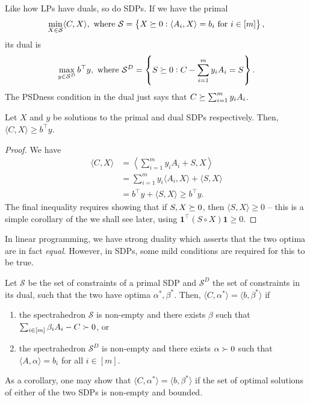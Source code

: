 	Like how LPs have duals, so do SDPs. If we have the primal
	\[ \min_{X \in \mathcal{S}} \langle C,X\rangle , \text{ where } \mathcal{S} = \left\{ X \succeq 0 : \langle A_i,X\rangle = b_i \text{ for $i \in [m]$} \right\}, \]
	its dual is
	\[ \max_{y \in \mathcal{S}^D} b^\top y, \text{ where } \mathcal{S}^D = \left\{ S \succeq 0 : C - \sum_{i=1}^m y_i A_i = S \right\}. \]
	The PSDness condition in the dual just says that $C \succeq \sum_{i=1}^m y_i A_i$.

	\begin{fprop}
		Let $X$ and $y$ be solutions to the primal and dual SDPs respectively. Then, $\langle C,X\rangle \ge b^\top y$.
	\end{fprop}
	\begin{proof}
		We have
		\begin{align*}
			\langle C,X\rangle &= \left\langle \sum_{i=1}^m y_i A_i + S , X \right\rangle \\
				&= \sum_{i=1}^m y_i \langle A_i,X\rangle + \langle S,X\rangle \\
				&= b^\top y + \langle S,X\rangle \ge b^\top y.
		\end{align*}
		The final inequality requires showing that if $S,X \succeq 0$, then $\langle S,X\rangle \ge 0$ -- this is a simple corollary of the  we shall see later, using $\mathbf{1}^\top (S \circ X) \mathbf{1} \ge 0$.
	\end{proof}

	In linear programming, we have strong duality which asserts that the two optima are in fact \emph{equal}. However, in SDPs, some mild conditions are required for this to be true. 

	\begin{ftheo}
		Let $\mathcal{S}$ be the set of constraints of a primal SDP and $\mathcal{S}^D$ the set of constraints in its dual, such that the two have optima $\alpha^*,\beta^*$. Then, $\langle C,\alpha^*\rangle = \langle b,\beta^*\rangle$ if
		\begin{enumerate}
			\item the spectrahedron $\mathcal{S}$ is non-empty and there exists $\beta$ such that $\sum_{i \in [m]}\beta_i A_i - C \succ 0$, or
			\item the spectrahedron $\mathcal{S}^D$ is non-empty and there exists $\alpha \succ 0$ such that $ \langle A,\alpha\rangle = b_i$ for all $i \in [m]$.
		\end{enumerate}
		As a corollary, one may show that $\langle C,\alpha^*\rangle = \langle b,\beta^*\rangle$ if the set of optimal solutions of either of the two SDPs is non-empty and bounded.
	\end{ftheo}

